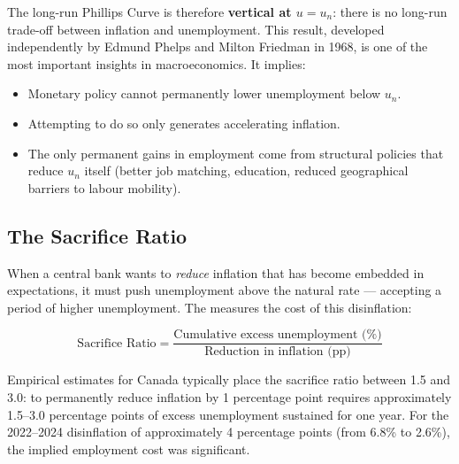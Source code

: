 The long-run Phillips Curve is therefore \textbf{vertical at $u = u_n$}:
there is no long-run trade-off between inflation and unemployment. This
result, developed independently by Edmund Phelps and Milton Friedman in
1968, is one of the most important insights in macroeconomics. It implies:
\begin{itemize}
  \item Monetary policy cannot permanently lower unemployment below $u_n$.
  \item Attempting to do so only generates accelerating inflation.
  \item The only permanent gains in employment come from structural
        policies that reduce $u_n$ itself (better job matching, education,
        reduced geographical barriers to labour mobility).
\end{itemize}

\subsection{The Sacrifice Ratio}

When a central bank wants to \textit{reduce} inflation that has become
embedded in expectations, it must push unemployment above the natural
rate --- accepting a period of higher unemployment. The  measures the cost of this disinflation:

\begin{equation}
  \text{Sacrifice Ratio} = \frac{\text{Cumulative excess unemployment (\%)}}
                                 {\text{Reduction in inflation (pp)}}
  \label{eq:sacrifice_ratio}
\end{equation}

Empirical estimates for Canada typically place the sacrifice ratio between
1.5 and 3.0: to permanently reduce inflation by 1 percentage point requires
approximately 1.5--3.0 percentage points of excess unemployment sustained
for one year. For the 2022--2024 disinflation of approximately 4 percentage
points (from 6.8\% to 2.6\%), the implied employment cost was significant.

